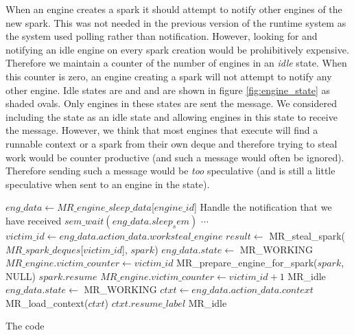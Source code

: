 When an engine creates a spark it should attempt to notify other engines of
the new spark.
This was not needed in the previous version of the runtime system as the
system used polling rather than notification.
However, looking for and notifying an idle engine on every spark creation
would be prohibitively expensive.
Therefore we maintain a counter of the number of engines in an \emph{idle}
state.
When this counter is zero, an engine creating a spark will not attempt to
notify any other engine.
Idle states are  and 
and are shown in figure \ref{fig:engine_state} as shaded ovals.
Only engines in these states are sent the  message.
We considered including the  state as an idle
state and allowing engines in this state to receive the
 message.
However, we think that most engines that execute \idle will find a runnable
context or a spark from their own deque and therefore trying to steal work
would be counter productive (and such a message would often be ignored).
Therefore sending such a message would be \emph{too} speculative
(and is still a little speculative when sent to an engine in the
 state).

\begin{algorithm}
\begin{algorithmic}[1]
        \State $eng\_data \gets MR\_engine\_sleep\_data$[$engine\_id$]
            \State Handle the notification that we have received
        \EndIf
        \State $sem\_wait(eng\_data.sleep_sem)$
            \State $\cdots$
          \EndCase
            \State $victim\_id \gets
                eng\_data.action\_data.worksteal\_engine$
            \Repeat
                \State $result \gets$
                    MR\_steal\_spark($MR\_spark\_deques$[$victim\_id$],
                        \text{\code{\&}}$spark$)
                \State $eng\_data.state \gets$ MR\_WORKING
                \State $MR\_engine.victim\_counter \gets victim\_id$
                \State MR\_prepare\_engine\_for\_spark($spark$, NULL)
                \Goto $spark.resume$
            \Else {}
                \State $MR\_engine.victim\_counter \gets victim\_id + 1$
                \Goto MR\_idle
            \EndIf
          \EndCase
            \State $eng\_data.state \gets$ MR\_WORKING
            \State $ctxt \gets eng\_data.action\_data.context$
            \State MR\_load\_context($ctxt$)
            \Goto $ctxt.resume\_label$
          \EndCase
            \Goto MR\_idle
          \EndCase
        \EndSwitch
    \EndProcedure
\end{algorithmic}
\caption{The \sleep code}
\label{alg:sleep}
\end{algorithm}

